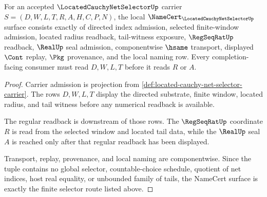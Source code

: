 \begin{theorem}
\label{thm:located-cauchy-net-selector-namecert-obligations}
For an accepted $\LocatedCauchyNetSelectorUp$ carrier $S=(D,W,L,T,R,A,H,C,P,N)$, the local $\NameCert_{\LocatedCauchyNetSelectorUp}$ surface consists exactly of directed index admission, selected finite-window admission, located radius readback, tail-witness exposure, $\RegSeqRatUp$ readback, $\RealUp$ seal admission, componentwise $\hsame$ transport, displayed $\Cont$ replay, $\Pkg$ provenance, and the local naming row. Every completion-facing consumer must read $D,W,L,T$ before it reads $R$ or $A$.
\end{theorem}
\begin{proof}
Carrier admission is projection from \autoref{def:located-cauchy-net-selector-carrier}. The rows $D,W,L,T$ display the directed substrate, finite window, located radius, and tail witness before any numerical readback is available.

The regular readback is downstream of those rows. The $\RegSeqRatUp$ coordinate $R$ is read from the selected window and located tail data, while the $\RealUp$ seal $A$ is reached only after that regular readback has been displayed.

Transport, replay, provenance, and local naming are componentwise. Since the tuple contains no global selector, countable-choice schedule, quotient of net indices, host real equality, or unbounded family of tails, the NameCert surface is exactly the finite selector route listed above.
\end{proof}



\begin{closurestatus}{\LocatedCauchyNetSelectorUp}
  \theoryclosure{\seedClosure}
  \formalstatus{\unformalizedV}
\end{closurestatus}
